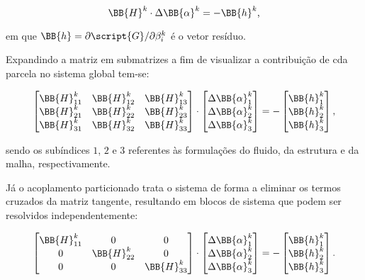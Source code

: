 \documentclass[_ArquivoPrincipal.tex]{subfiles}
\begin{document}
\begin{equation}
    \BB{H}^k\cdot\Delta\BB{\alpha}^k=-\BB{h}^k\text{,}
\end{equation}

\noindent em que $\BB{h}=\partial\script{G}/\partial\beta_i^k$ é o vetor resíduo.

Expandindo a matriz em submatrizes a fim de visualizar a contribuição de cda parcela no sistema global tem-se:

\begin{equation}
    \begin{bmatrix}
        \BB{H}_{11}^k & \BB{H}_{12}^k & \BB{H}_{13}^k \\
        \BB{H}_{21}^k & \BB{H}_{22}^k & \BB{H}_{23}^k \\
        \BB{H}_{31}^k & \BB{H}_{32}^k & \BB{H}_{33}^k
    \end{bmatrix}\cdot\begin{bmatrix}
        \Delta\BB{\alpha}_1^k \\\Delta\BB{\alpha}_2^k\\\Delta\BB{\alpha}_3^k
    \end{bmatrix}=-\begin{bmatrix}
        \BB{h}_1^k \\\BB{h}_2^k\\\BB{h}_3^k
    \end{bmatrix}\text{,}
\end{equation}

\noindent sendo os subíndices $1$, $2$ e $3$ referentes às formulações do fluido, da estrutura e da malha, respectivamente.

Já o acoplamento particionado trata o sistema de forma a eliminar os termos cruzados da matriz tangente, resultando em blocos de sistema que podem ser resolvidos independentemente:

\begin{equation}
    \begin{bmatrix}
        \BB{H}_{11}^k & 0             & 0             \\
        0             & \BB{H}_{22}^k & 0             \\
        0             & 0             & \BB{H}_{33}^k
    \end{bmatrix}\cdot\begin{bmatrix}
        \Delta\BB{\alpha}_1^k \\\Delta\BB{\alpha}_2^k\\\Delta\BB{\alpha}_3^k
    \end{bmatrix}=-\begin{bmatrix}
        \BB{h}_1^k \\\BB{h}_2^k\\\BB{h}_3^k
    \end{bmatrix}\text{.}
\end{equation}
\end{document}
